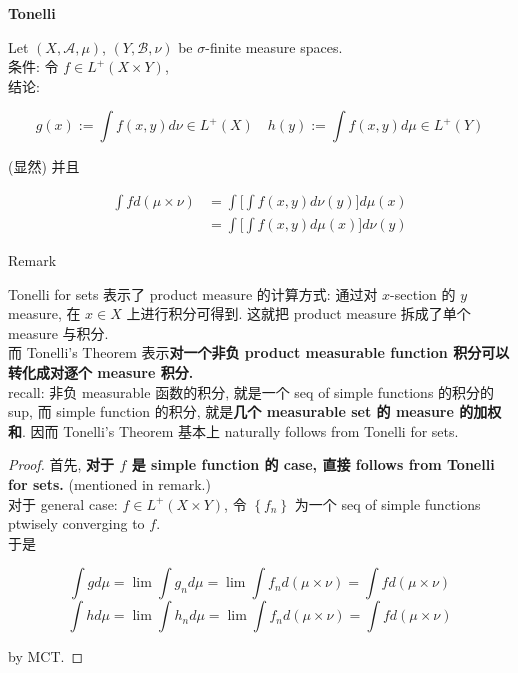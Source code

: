 \documentclass{qlnotes-export}
\begin{document}
\begin{theorem}{\protect{}\label{kn-tonelli-theorem}{\textbf{Tonelli}}}

Let \((X,\mathcal{A},\mu)\), \((Y,\mathcal{B},\nu)\) be \(\sigma\)-finite measure spaces.\\
条件: 令 \(f \in L^{+}(X \times Y)\),\\
结论:

\[g(x) := \int f(x,y) d\nu \in L^{+}(X)\quad h(y) := \int f(x,y) d\mu \in L^{+}(Y)\]

(显然) 并且

\[\begin{matrix}
{\int f d(\mu \times \nu)} & {= \int\lbrack\int f(x,y) d\nu(y)\rbrack d\mu(x)} \\
 & {= \int\lbrack\int f(x,y) d\mu(x)\rbrack d\nu(y)}
\end{matrix}\]

\end{theorem}

\begin{qlremark}{Remark}

Tonelli for sets 表示了 product measure 的计算方式: 通过对 \(x\)-section 的 \(y\) measure, 在 \(x \in X\) 上进行积分可得到. 这就把 product measure 拆成了单个 measure 与积分.\\
而 Tonelli's Theorem 表示\textbf{对一个非负 product measurable function 积分可以转化成对逐个 measure 积分.}\\
recall: 非负 measurable 函数的积分, 就是一个 seq of simple functions 的积分的 sup, 而 simple function 的积分, 就是\textbf{几个 measurable set 的 measure 的加权和}. 因而 Tonelli's Theorem 基本上 naturally follows from Tonelli for sets.

\end{qlremark}

\begin{proof}

首先, \textbf{对于 \(f\) 是 simple function 的 case, 直接 follows from Tonelli for sets.} (mentioned in remark.)\\
对于 general case: \(f \in L^{+}(X \times Y)\), 令 \(\left\{ f_{n} \right\}\) 为一个 seq of simple functions ptwisely converging to \(f\).\\
于是

\[\int g d\mu = \lim\int g_{n} d\mu = \lim\int f_{n} d(\mu \times \nu) = \int f d(\mu \times \nu)\]\[\int h d\mu = \lim\int h_{n} d\mu = \lim\int f_{n} d(\mu \times \nu) = \int f d(\mu \times \nu)\]

by MCT.

\end{proof}
\end{document}
